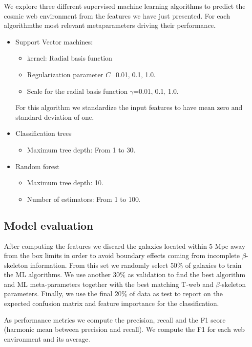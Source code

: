 \documentclass[usenatbib]{mnras}
\begin{document}
We explore three different supervised machine learning algorithms to
predict the cosmic web environment from the features we have just
presented. 
For each algorithmthe most relevant metaparameters driving their
performance.

\begin{itemize}
    \item Support Vector machines: 
        \begin{itemize}
            \item kernel: Radial basis function
            \item Regularization parameter $C$=0.01, 0.1, 1.0.
            \item Scale for the radial basis function  $\gamma$=0.01, 0.1, 1.0.
        \end{itemize}
        For this algorithm we standardize the input features to have
        mean zero and standard deviation of one. 
    \item Classification trees
      \begin{itemize}
      \item Maximum tree depth: From 1 to 30.
      \end{itemize}
    \item Random forest
        \begin{itemize}
            \item Maximum tree depth: 10.
            \item Number of estimators: From 1 to 100.
        \end{itemize}
\end{itemize}

\subsection{Model evaluation}

After computing the features we discard the galaxies located within 5 Mpc
away from the box limits  in order  to avoid boundary effects coming
from incomplete $\beta$-skeleton information.  
From this set we randomly select $50\%$ of galaxies to train the ML
algorithms.   
We use another $30\%$ as validation to find the best algorithm and ML
meta-parameters together with the best matching T-web and
$\beta$-skeleton parameters.   
Finally, we use the final $20 \%$ of data as test to report
on the expected confusion matrix and feature importance for the
classification. 

As performance metrics we compute the precision, recall and the F1
score (harmonic mean between precision and recall).  
We compute the F1 for each web environment and its average.
\end{document}
